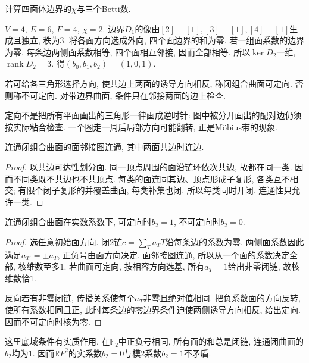 \begin{example}
计算四面体边界的$\chi$与三个Betti数.
\end{example}
\begin{solution}
$V=4$, $E=6$, $F=4$, $\chi=2$. 边界$D_1$的像由$[2]-[1],[3]-[1],[4]-[1]$生成且独立, 秩为$3$. 将各面方向选成外向, 四个面边界的和为零. 若一组面系数的边界为零, 每条边两侧面系数相等, 四个面相互邻接, 因而全部相等. 所以$\ker D_2$一维, $\operatorname{rank}D_2=3$. 得$(b_0,b_1,b_2)=(1,0,1)$.
\end{solution}

\begin{definition}
若可给各三角形选择方向, 使共边上两面的诱导方向相反, 称闭组合曲面可定向. 否则称不可定向. 对带边界曲面, 条件只在邻接两面的边上检查.
\end{definition}
定向不是把所有平面画出的三角形一律画成逆时针: 图中被分开画出的配对边仍须按实际粘合检查. 一个圈走一周后局部方向可能翻转, 正是M\"obius带的现象.

\begin{lemma}\label{lem:dual-connected}
连通闭组合曲面的面邻接图连通, 其中两面共边时连边.
\end{lemma}
\begin{proof}
以共边可达性划分面. 同一顶点周围的面沿链环依次共边, 故都在同一类. 因而不同类既不共边也不共顶点. 每类的面连同其边、顶点形成子复形, 各类互不相交; 有限个闭子复形的并覆盖曲面, 每类补集也闭, 所以每类同时开闭. 连通性只允许一类.
\end{proof}

\begin{theorem}\label{thm:surface-b2}
连通闭组合曲面在实数系数下, 可定向时$b_2=1$, 不可定向时$b_2=0$.
\end{theorem}
\begin{proof}
选任意初始面方向. 闭$2$链$c=\sum_T a_T T$沿每条边的系数为零. 两侧面系数因此满足$a_{T'}=\pm a_T$, 正负号由面方向决定. 面邻接图连通, 所以从一个面的系数决定全部, 核维数至多$1$. 若曲面可定向, 按相容方向选基, 所有$a_T=1$给出非零闭链, 故核维数恰$1$.

反向若有非零闭链, 传播关系使每个$a_T$非零且绝对值相同. 把负系数面的方向反转, 使所有系数相同且正, 此时每条边的零边界条件迫使两侧诱导方向相反, 给出定向. 因而不可定向时核为零.
\end{proof}
这里底域条件有实质作用. 在$\mathbb F_2$中正负号相同, 所有面的和总是闭链, 连通闭曲面的$b_2$均为$1$. 因而$\mathbb RP^2$的实系数$b_2=0$与模$2$系数$b_2=1$不矛盾.

